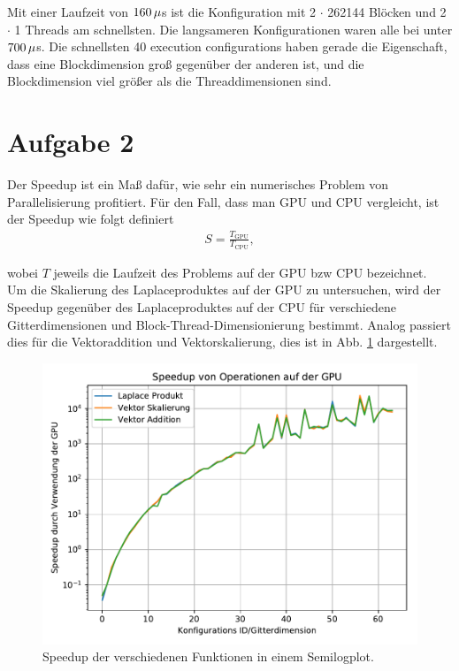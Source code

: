 \documentclass[10pt,a4paper]{article}
\begin{document}
Mit einer Laufzeit von $160\thinspace\mu$s ist die Konfiguration mit \num{2} $\cdot$ \num{262144} Blöcken und \num{2} $\cdot$ \num{1} Threads am schnellsten. Die langsameren Konfigurationen waren alle bei unter $700\thinspace\mu$s.
Die schnellsten \num{40} execution configurations haben gerade die Eigenschaft, dass eine Blockdimension groß gegenüber der anderen ist,
und die Blockdimension viel größer als die Threaddimensionen sind.
\section{Aufgabe 2}

Der Speedup ist ein Maß dafür, wie sehr ein numerisches Problem von Parallelisierung profitiert.
Für den Fall, dass man GPU und CPU vergleicht, ist der Speedup wie folgt definiert
\begin{align*}
  S = \frac{T_\text{GPU}}{T_\text{CPU}},
\end{align*}

wobei $T$ jeweils die Laufzeit des Problems auf der GPU bzw CPU bezeichnet.\\

Um die Skalierung des Laplaceproduktes auf der GPU zu untersuchen, wird der Speedup gegenüber
des Laplaceproduktes auf der CPU für verschiedene Gitterdimensionen und
Block-Thread-Dimensionierung bestimmt. Analog passiert dies für die Vektoraddition und Vektorskalierung, dies ist in Abb. \ref{fig:speedup} dargestellt.

\begin{figure}[H]
  \centering
  \includegraphics[width=.85\textwidth]{../aufg2/figures/speedup.pdf}
  \caption{
    Speedup der verschiedenen Funktionen in einem Semilogplot.
  }
  \label{fig:speedup}
\end{figure}
\end{document}
